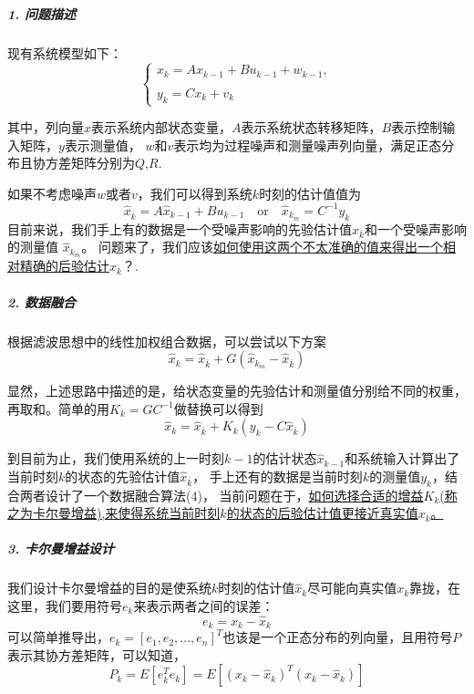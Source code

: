\documentclass[UTF8,a4paper,10pt]{ctexart}
\begin{document}
\subparagraph{1. 问题描述}
    现有系统模型如下：
    \begin{equation}
        \left\{
            \begin{array}{cc}
               x_k = Ax_{k-1}+Bu_{k-1} + w_{k-1},\\ \\
               y_k = Cx_{k} + v_{k}
            \end{array}
        \right.
    \end{equation}\label{model}

其中，列向量$x$表示系统内部状态变量，$A$表示系统状态转移矩阵，$B$表示控制输入矩阵，$y$表示测量值，
$w$和$v$表示均为过程噪声和测量噪声列向量，满足正态分布且协方差矩阵分别为$Q$,$R$.

如果不考虑噪声$w$或者$v$，我们可以得到系统$k$时刻的估计值值为
\begin{equation}
    \hat{x}_{\bar{k}} = A\hat{x}_{k-1}+Bu_{k-1} \quad \text{or} \quad  \hat{x}_{k_{m}} = C^{-1}y_k
\end{equation}\label{predict_forward}
目前来说，我们手上有的数据是一个受噪声影响的先验估计值$\hat{x}_{\bar{k}}$和一个受噪声影响的测量值 $\hat{x}_{k_{m}}$。
问题来了，我们应该\uline{如何使用这两个不太准确的值来得出一个相对精确的后验估计$\hat{x}_{k}$}？.

\subparagraph{2. 数据融合}
    根据滤波思想中的线性加权组合数据，可以尝试以下方案
    \begin{equation}
        \hat{x}_{k} = \hat{x}_{\bar{k}} + G(\hat{x}_{k_{m}}- \hat{x}_{\bar{k}})
    \end{equation}\label{predict_r}

    显然，上述思路中描述的是，给状态变量的先验估计和测量值分别给不同的权重，再取和。简单的用$K_k=GC^{-1}$做替换可以得到
    \begin{equation}
        \hat{x}_{k} = \hat{x}_{\bar{k}} + K_k(y_k- C\hat{x}_{\bar{k}})\label{predict}
    \end{equation}
    
    到目前为止，我们使用系统的上一时刻$k-1$的估计状态$\hat{x}_{k-1}$和系统输入计算出了当前时刻$k$的状态的先验估计值$\hat{x}_{\bar{k}}$，
    手上还有的数据是当前时刻$k$的测量值$y_k$，结合两者设计了一个数据融合算法(4)，
    当前问题在于，\uline{如何选择合适的增益$K_k$(称之为卡尔曼增益),来使得系统当前时刻$k$的状态的后验估计值更接近真实值$x_k$。}

\subparagraph{3. 卡尔曼增益设计}
    我们设计卡尔曼增益的目的是使系统$k$时刻的估计值$\hat{x}_k$尽可能向真实值$x_k$靠拢，在这里，我们要用符号$e_k$来表示两者之间的误差：
    \begin{equation}
        e_k = x_k - \hat{x}_k
    \end{equation}\label{e_k}
    可以简单推导出，$e_k=[e_1,e_2,...,e_n]^T$也该是一个正态分布的列向量，且用符号$P$表示其协方差矩阵，可以知道，
    \begin{equation}
        P_k = E[e^T_k e_k] = E[(x_k - \hat{x}_k)^T(x_k - \hat{x}_k)]
    \end{equation}\label{sdsf}
    
\end{document}
